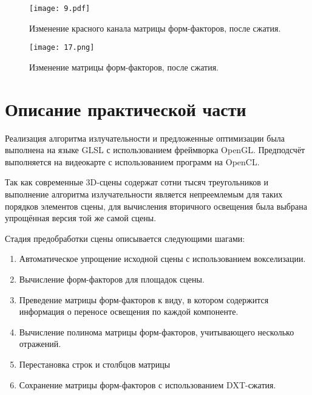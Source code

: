 \documentclass[12pt,fleqn]{article}
\begin{document}
\begin{figure}[htb]
    \centering
    \texttt{[image: 9.pdf]}
    \caption{Изменение красного канала матрицы форм-факторов, после сжатия.}
    \label{red_comparison}
\end{figure}

\begin{figure}[htb]
    \centering
    \texttt{[image: 17.png]}
    \caption{Изменение матрицы форм-факторов, после сжатия.}
    \label{rgb_comparison}
\end{figure}

\pagebreak

\section{Описание практической части}

Реализация алгоритма излучательности и предложенные оптимизации была выполнена на языке GLSL с использованием фреймворка OpenGL. Предподсчёт выполняется на видеокарте с использованием программ на OpenCL. 

Так как современные 3D-сцены содержат сотни тысяч треугольников и выполнение алгоритма излучательности является непреемлемым для таких порядков элементов сцены, для вычисления вторичного освещения была выбрана упрощённая версия той же самой сцены.

Стадия предобработки сцены описывается следующими шагами:

\begin{enumerate}

\item Автоматическое упрощение исходной сцены с использованием вокселизации.

\item Вычисление форм-факторов для площадок сцены.

\item Преведение матрицы форм-факторов к виду, в котором содержится информация о переносе освещения по каждой компоненте.

\item Вычисление полинома матрицы форм-факторов, учитывающего несколько отражений.

\item Перестановка строк и столбцов матрицы

\item Сохранение матрицы форм-факторов с использованием DXT-сжатия.

\end{enumerate}
\end{document}
